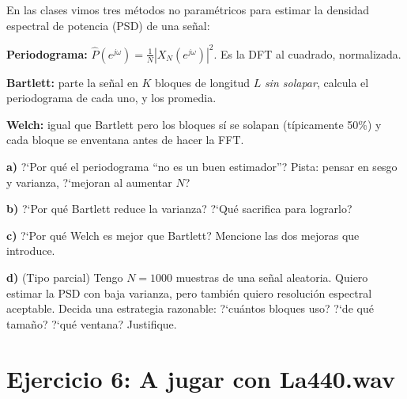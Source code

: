 \documentclass[11pt, a4paper]{article}
\begin{document}
\begin{enun}
En las clases vimos tres m\'etodos no param\'etricos para estimar la
densidad espectral de potencia (PSD) de una se\~nal:

\smallskip
\textbf{Periodograma:} $\hat{P}(e^{j\omega}) = \frac{1}{N}|X_N(e^{j\omega})|^2$.
Es la DFT al cuadrado, normalizada.

\textbf{Bartlett:} parte la se\~nal en $K$ bloques de longitud $L$
\emph{sin solapar}, calcula el periodograma de cada uno, y los promedia.

\textbf{Welch:} igual que Bartlett pero los bloques s\'i se solapan
(t\'ipicamente 50\%) y cada bloque se enventana antes de hacer la FFT.

\smallskip
\textbf{a)} ?`Por qu\'e el periodograma ``no es un buen estimador''?
Pista: pensar en sesgo y varianza, ?`mejoran al aumentar $N$?

\textbf{b)} ?`Por qu\'e Bartlett reduce la varianza? ?`Qu\'e sacrifica para
lograrlo?

\textbf{c)} ?`Por qu\'e Welch es mejor que Bartlett?
Mencione las dos mejoras que introduce.

\textbf{d)} (Tipo parcial)
Tengo $N = 1000$ muestras de una se\~nal aleatoria.
Quiero estimar la PSD con baja varianza, pero tambi\'en quiero resoluci\'on
espectral aceptable.
Decida una estrategia razonable: ?`cu\'antos bloques uso? ?`de qu\'e tama\~no?
?`qu\'e ventana? Justifique.
\end{enun}

\section*{Ejercicio 6: A jugar con La440.wav}
\end{document}
